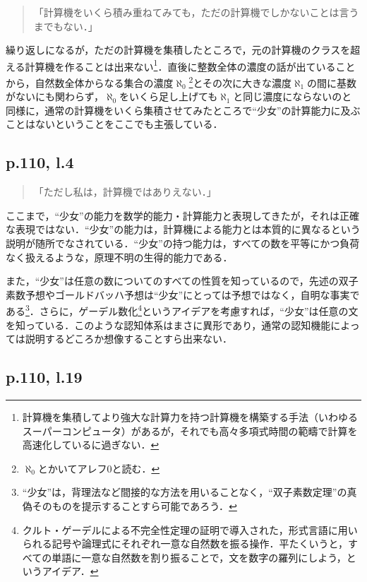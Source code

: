 \documentclass[10pt, a5paper, twoside]{jsarticle}
\theoremstyle{definition}
\begin{document}
			\begin{quote}

				「計算機をいくら積み重ねてみても，ただの計算機でしかないことは言うまでもない．」
				
			\end{quote}

			繰り返しになるが，ただの計算機を集積したところで，元の計算機のクラスを超える計算機を作ることは出来ない\footnote{計算機を集積してより強大な計算力を持つ計算機を構築する手法（いわゆるスーパーコンピュータ）があるが，それでも高々多項式時間の範疇で計算を高速化しているに過ぎない．}．直後に整数全体の濃度の話が出ていることから，自然数全体からなる集合の濃度$\aleph_0$\footnote{$\aleph_0$とかいてアレフ0と読む．}とその次に大きな濃度$\aleph_1$の間に基数がないにも関わらず，$\aleph_0$をいくら足し上げても$\aleph_1$と同じ濃度にならないのと同様に，通常の計算機をいくら集積させてみたところで“少女”の計算能力に及ぶことはないということをここでも主張している．

		\subsection{p.110, l.4}

			\begin{quote}

				「ただし私は，計算機ではありえない．」
				
			\end{quote}

			ここまで，“少女”の能力を数学的能力・計算能力と表現してきたが，それは正確な表現ではない．“少女”の能力は，計算機による能力とは本質的に異なるという説明が随所でなされている．“少女”の持つ能力は，すべての数を平等にかつ負荷なく扱えるような，原理不明の生得的能力である．

			また，“少女”は任意の数についてのすべての性質を知っているので，先述の双子素数予想やゴールドバッハ予想は“少女”にとっては予想ではなく，自明な事実である\footnote{“少女”は，背理法など間接的な方法を用いることなく，“双子素数定理”の真偽そのものを提示することすら可能であろう．}．さらに，ゲーデル数化\footnote{クルト・ゲーデルによる不完全性定理の証明で導入された，形式言語に用いられる記号や論理式にそれぞれ一意な自然数を振る操作．平たくいうと，すべての単語に一意な自然数を割り振ることで，文を数字の羅列にしよう，というアイデア．}というアイデアを考慮すれば，“少女”は任意の文を知っている．このような認知体系はまさに異形であり，通常の認知機能によっては説明するどころか想像することすら出来ない．

		\subsection{p.110, l.19}
\end{document}
